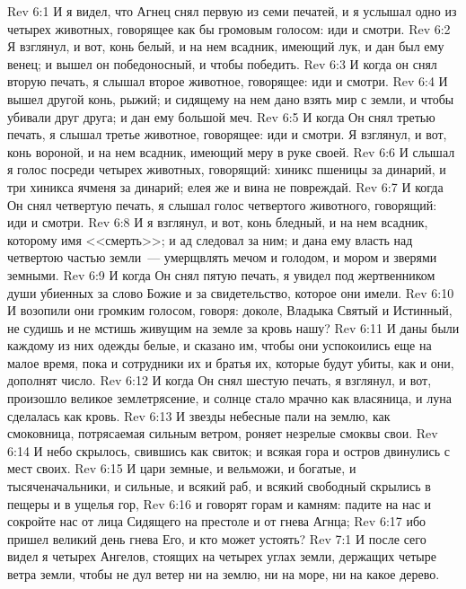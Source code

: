 \vs Rev 6:1 И я видел, что Агнец снял первую из семи печатей, и я услышал одно из четырех животных, говорящее как бы громовым голосом: иди и смотри.
\vs Rev 6:2 Я взглянул, и вот, конь белый, и на нем всадник, имеющий лук, и дан был ему венец; и вышел он  победоносный, и чтобы победить.
\rsbpar\vs Rev 6:3 И когда он снял вторую печать, я слышал второе животное, говорящее: иди и смотри.
\vs Rev 6:4 И вышел другой конь, рыжий; и сидящему на нем дано взять мир с земли, и чтобы убивали друг друга; и дан ему большой меч.
\rsbpar\vs Rev 6:5 И когда Он снял третью печать, я слышал третье животное, говорящее: иди и смотри. Я взглянул, и вот, конь вороной, и на нем всадник, имеющий меру в руке своей.
\vs Rev 6:6 И слышал я голос посреди четырех животных, говорящий: хиникс пшеницы за динарий, и три хиникса ячменя за динарий; елея же и вина не повреждай.
\rsbpar\vs Rev 6:7 И когда Он снял четвертую печать, я слышал голос четвертого животного, говорящий: иди и смотри.
\vs Rev 6:8 И я взглянул, и вот, конь бледный, и на нем всадник, которому имя <<смерть>>; и ад следовал за ним; и дана ему власть над четвертою частью земли~--- умерщвлять мечом и голодом, и мором и зверями земными.
\rsbpar\vs Rev 6:9 И когда Он снял пятую печать, я увидел под жертвенником души убиенных за слово Божие и за свидетельство, которое они имели.
\vs Rev 6:10 И возопили они громким голосом, говоря: доколе, Владыка Святый и Истинный, не судишь и не мстишь живущим на земле за кровь нашу?
\vs Rev 6:11 И даны были каждому из них одежды белые, и сказано им, чтобы они успокоились еще на малое время, пока и сотрудники их и братья их, которые будут убиты, как и они, дополнят число.
\rsbpar\vs Rev 6:12 И когда Он снял шестую печать, я взглянул, и вот, произошло великое землетрясение, и солнце стало мрачно как власяница, и луна сделалась как кровь.
\vs Rev 6:13 И звезды небесные пали на землю, как смоковница, потрясаемая сильным ветром, роняет незрелые смоквы свои.
\vs Rev 6:14 И небо скрылось, свившись как свиток; и всякая гора и остров двинулись с мест своих.
\vs Rev 6:15 И цари земные, и вельможи, и богатые, и тысяченачальники, и сильные, и всякий раб, и всякий свободный скрылись в пещеры и в ущелья гор,
\vs Rev 6:16 и говорят горам и камням: падите на нас и сокройте нас от лица Сидящего на престоле и от гнева Агнца;
\vs Rev 6:17 ибо пришел великий день гнева Его, и кто может устоять?
\vs Rev 7:1 И после сего видел я четырех Ангелов, стоящих на четырех углах земли, держащих четыре ветра земли, чтобы не дул ветер ни на землю, ни на море, ни на какое дерево.
